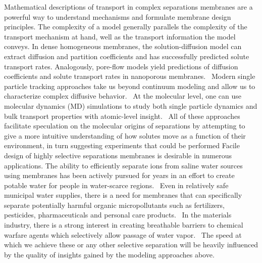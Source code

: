 \documentclass{article}
\begin{document}
  Mathematical descriptions of transport in complex separations membranes are a powerful 
  way to understand mechanisms and formulate membrane design principles. 
  The complexity
  of a model generally parallels the complexity of the transport mechanism at hand, 
  well as 
  the transport information the model conveys.
  In dense homogeneous membranes, the solution-diffusion 
  model can extract diffusion and partition coefficients and has successfully predicted
  solute transport rates. 
  Analogously, pore-flow models yield predictions of diffusion 
  coefficients and solute transport rates in nanoporous membranes.~\cite{wijmans_solution-diffusion_1995}
  Modern single particle tracking approaches take us beyond continuum modeling and 
  allow us to characterize complex diffusive behavior.~\cite{manzo_review_2015} 
  At the molecular level, one can use molecular dynamics (MD) simulations to study both
  single particle dynamics and bulk transport properties with atomic-level insight.~\cite{coscia_chemically_2019,maginn_best_2018}
  All of these approaches facilitate speculation on the molecular origins of separations
  by attempting to give a more intuitive understanding of how solutes move as a function
  of their environment, in turn suggesting experiments that 
  could be performed
  Facile design
  of highly selective separations membranes is desirable in numerous
  applications. The ability to efficiently separate ions from saline water sources using 
  membranes has been actively pursued for years in an effort to create potable water for 
  people in water-scarce regions.~\cite{werber_materials_2016} Even in relatively safe
  municipal water supplies, there is a need for membranes that can specifically separate
  potentially harmful organic micropollutants such as fertilizers, pesticides, pharmaceuticals
  and personal care products.~\cite{barbosa_occurrence_2016} In the materials industry,
  there is a strong interest in creating breathable barriers to chemical warfare agents
  which selectively allow passage of water vapor.~\cite{mondloch_destruction_2015}
  The speed at which we achieve these or any other selective separation will be 
  heavily influenced by the quality of insights gained by the modeling approaches above.
\end{document}
